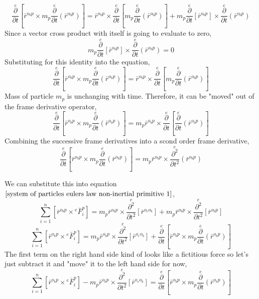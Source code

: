 $$\overset{e}{\frac{\partial}{\partial t}}\left[\bar{r}^{o_{b}p}\times m_{p}\overset{e}{\frac{\partial}{\partial t}}(\bar{r}^{o_{b}p})\right] = 
\bar{r}^{o_{b}p}\times\overset{e}{\frac{\partial}{\partial t}}\left[m_{p}\overset{e}{\frac{\partial}{\partial t}}(\bar{r}^{o_{b}p})\right]
 + m_{p}\overset{e}{\frac{\partial}{\partial t}}\left[\bar{r}^{o_{b}p}\right]\times\overset{e}{\frac{\partial}{\partial t}}(\bar{r}^{o_{b}p})$$
 Since a vector cross product with itself is going to evaluate to zero,
$$m_{p}\overset{e}{\frac{\partial}{\partial t}}\left[\bar{r}^{o_{b}p}\right]\times\overset{e}{\frac{\partial}{\partial t}}(\bar{r}^{o_{b}p}) = 0$$
Substituting for this identity into the equation,
$$\overset{e}{\frac{\partial}{\partial t}}\left[\bar{r}^{o_{b}p}\times m_{p}\overset{e}{\frac{\partial}{\partial t}}(\bar{r}^{o_{b}p})\right] = 
\bar{r}^{o_{b}p}\times\overset{e}{\frac{\partial}{\partial t}}\left[m_{p}\overset{e}{\frac{\partial}{\partial t}}(\bar{r}^{o_{b}p})\right]$$
Mass of particle $m_{p}$ is unchanging with time.
Therefore, it can be "moved" out of the frame derivative operator,
$$\overset{e}{\frac{\partial}{\partial t}}\left[\bar{r}^{o_{b}p}\times m_{p}\overset{e}{\frac{\partial}{\partial t}}(\bar{r}^{o_{b}p})\right] = m_{p}\bar{r}^{o_{b}p}\times\overset{e}{\frac{\partial}{\partial t}}\left[\overset{e}{\frac{\partial}{\partial t}}(\bar{r}^{o_{b}p})\right]$$
Combining the successive frame derivatives into a scond order frame derivative,
$$\overset{e}{\frac{\partial}{\partial t}}\left[\bar{r}^{o_{b}p}\times m_{p}\overset{e}{\frac{\partial}{\partial t}}(\bar{r}^{o_{b}p})\right] = m_{p}\bar{r}^{o_{b}p}\times\overset{e}{\frac{\partial^{2}}{\partial t^{2}}}(\bar{r}^{o_{b}p})$$

We can substitute this into equation $\ref{system of particles eulers law non-inertial primitive 1}$,
$$\sum^{n}_{i = 1}\left[\bar{r}^{o_{b}p}\times{}^{e}\bar{F}^{p}_{i}\right] = m_{p}\bar{r}^{o_{b}p}\times\overset{e}{\frac{\partial^{2}}{\partial t^{2}}}[\bar{r}^{o_{e}o_{b}}] + m_{p}\bar{r}^{o_{b}p}\times\overset{e}{\frac{\partial^{2}}{\partial t^{2}}}[\bar{r}^{o_{b}p}]$$
$$\sum^{n}_{i = 1}\left[\bar{r}^{o_{b}p}\times{}^{e}\bar{F}^{p}_{i}\right] = m_{p}\bar{r}^{o_{b}p}\times\overset{e}{\frac{\partial^{2}}{\partial t^{2}}}[\bar{r}^{o_{e}o_{b}}] + \overset{e}{\frac{\partial}{\partial t}}\left[\bar{r}^{o_{b}p}\times m_{p}\overset{e}{\frac{\partial}{\partial t}}(\bar{r}^{o_{b}p})\right]$$
The first term on the right hand side kind of looks like a fictitious force so let's just subtract it and "move" it to the left hand side for now,
\begin{equation}
\sum^{n}_{i = 1}\left[\bar{r}^{o_{b}p}\times{}^{e}\bar{F}^{p}_{i}\right] - m_{p}\bar{r}^{o_{b}p}\times\overset{e}{\frac{\partial^{2}}{\partial t^{2}}}[\bar{r}^{o_{e}o_{b}}] = \overset{e}{\frac{\partial}{\partial t}}\left[\bar{r}^{o_{b}p}\times m_{p}\overset{e}{\frac{\partial}{\partial t}}(\bar{r}^{o_{b}p})\right]
\label{system of particles eulers law non-inertial primitive 2}
\end{equation}

